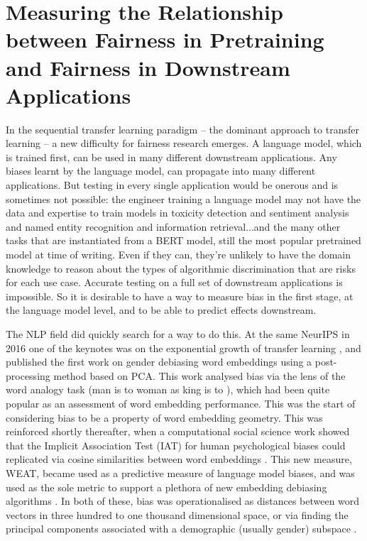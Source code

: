 \part{Measuring the Relationship between Fairness in Pretraining and Fairness in Downstream Applications}
\label{part:measurement}

In the sequential transfer learning paradigm -- the dominant approach to transfer learning --  a new difficulty for fairness research emerges. A language model, which is trained first, can be used in many different downstream applications. Any biases learnt by the language model, can propagate into many different applications. But testing in every single application would be onerous and is sometimes not possible: the engineer training a language model may not have the data and expertise to train models in toxicity detection and sentiment analysis and named entity recognition and information retrieval...and the many other tasks that are instantiated from a BERT model, still the most popular pretrained model at time of writing. 
Even if they can, they're unlikely to have the domain knowledge to reason about the types of algorithmic discrimination that are risks for each use case.
Accurate testing on a full set of downstream applications is impossible. So it is desirable to have a way to measure bias in the first stage, at the language model level, and to be able to predict effects downstream.

The NLP field did quickly search for a way to do this. At the same NeurIPS in 2016 one of the keynotes was on the exponential growth of transfer learning \citep{ng2016nuts}, and \citet{bolukbasi} published the first work on gender debiasing word embeddings using a post-processing method based on PCA. This work analysed bias via the lens of the word analogy task (man is to woman as king is to \textunderscore), which had been quite popular as an assessment of word embedding performance. This was the start of considering bias to be a property of word embedding geometry.
This was reinforced shortly thereafter, when a computational social science work showed that the Implicit Association Test (IAT) for human psychological biases could replicated via cosine similarities between word embeddings \citet{Caliskan2017SemanticsDA}. This new measure, WEAT, became used as a predictive measure of language model biases, and was used as the sole metric to support a plethora of new embedding debiasing algorithms \citep{list_alot}.  
In both of these, bias was operationalised as distances between word vectors in three hundred to one thousand dimensional space, or via finding the principal components associated with a demographic (usually gender) subspace \citep{ethayarajh-etal-2019-understanding}. 

